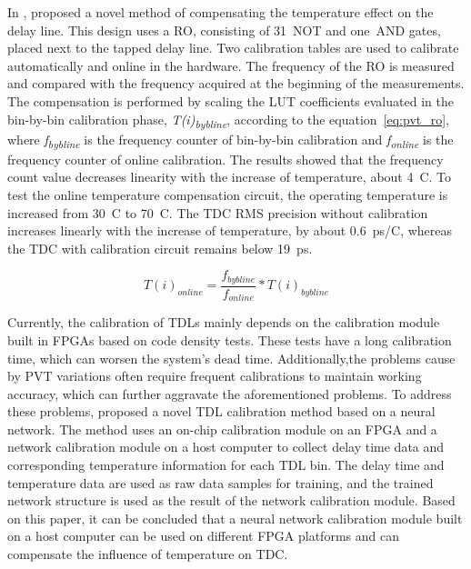 In \citeyear{pvt_ro}, \citet{pvt_ro} proposed a novel method of compensating the temperature effect on the delay line. This design uses a \acrlong{RO}, consisting of 31~NOT and one~AND gates, placed next to the tapped delay line. Two calibration tables are used to calibrate automatically and online in the hardware. The frequency of the \gls{RO} is measured and compared with the frequency acquired at the beginning of the measurements. The compensation is performed by scaling the \acrlong{LUT} coefficients evaluated in the bin-by-bin calibration phase, \textit{T(i)\textsubscript{bybline}}, according to the equation~\ref{eq:pvt_ro}, where \textit{f\textsubscript{bybline}} is the frequency counter of bin-by-bin calibration and \textit{f\textsubscript{online}} is the frequency counter of online calibration. The results showed that the frequency count value decreases linearity with the increase of temperature, about 4~\textdegree C. To test the online temperature compensation circuit, the operating temperature is increased from 30~\textdegree C to 70~\textdegree C. The \gls{TDC} \gls{RMS} precision without calibration increases linearly with the increase of temperature, by about 0.6~ps/\textdegree C, whereas the \gls{TDC} with calibration circuit remains below 19~ps.

\begin{equation}
	T(i)_{online} = \frac{f_{bybline}}{f_{online}} * T(i)_{bybline}
	\label{eq:pvt_ro}
\end{equation}

Currently, the calibration of \glspl{TDL} mainly depends on the calibration module built in \glspl{FPGA} based on code density tests. These tests have a long calibration time, which can worsen the system's dead time. Additionally,the problems cause by \gls{PVT} variations often require frequent calibrations to maintain working accuracy, which can further aggravate the aforementioned problems. To address these problems, \citet{bin_by_bin_calibration_neural_network} proposed a novel \gls{TDL} calibration method based on a neural network. The method uses an on-chip calibration module on an \gls{FPGA} and a network calibration module on a host computer to collect delay time data and corresponding temperature information for each \gls{TDL} bin. The delay time and temperature data are used as raw data samples for training, and the trained network structure is used as the result of the network calibration module. Based on this paper, it can be concluded that a neural network calibration module built on a host computer can be used on different \gls{FPGA} platforms and can compensate the influence of temperature on \gls{TDC}.